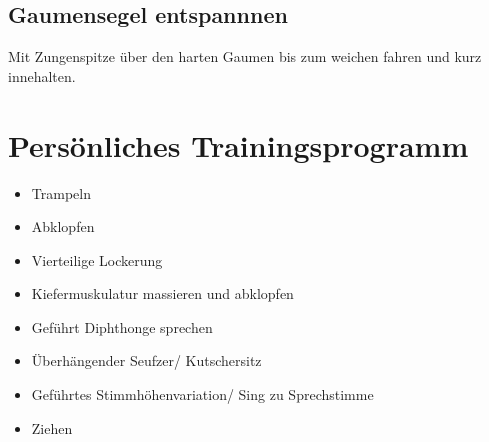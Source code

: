\documentclass[ngerman, a4paper, twoside]{scrbook}%
\begin{document}
	  \section{Gaumensegel entspannnen}
	  Mit Zungenspitze über den harten Gaumen bis zum weichen fahren und kurz innehalten.



	  \chapter{Persönliches Trainingsprogramm}
	  \begin{itemize}
	  	\item Trampeln
	  	\item Abklopfen
	  	\item Vierteilige Lockerung
	  	\item Kiefermuskulatur massieren und abklopfen
	  	\item Geführt Diphthonge sprechen
	  	\item Überhängender Seufzer/ Kutschersitz
	  	\item Geführtes Stimmhöhenvariation/ Sing zu Sprechstimme
	  	\item Ziehen
	  \end{itemize}
\end{document}
